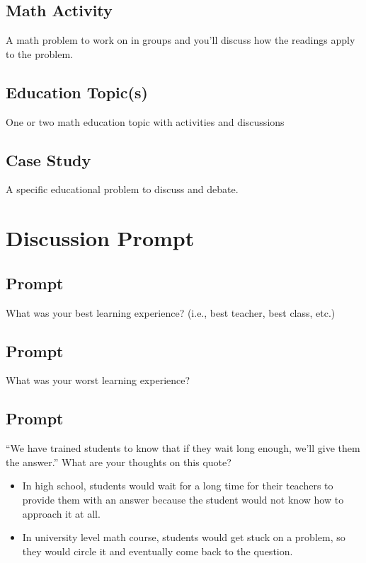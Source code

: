 \documentclass[11pt]{amsart}
\begin{document}
\subsection{Math Activity}

A math problem to work on in groups and you'll discuss how the readings apply to the problem.

\subsection{Education Topic(s)}

One or two math education topic with activities and discussions

\subsection{Case Study}

A specific educational problem to discuss and debate.

\section{Discussion Prompt}

\subsection{Prompt} 

What was your best learning experience? (i.e., best teacher, best class, etc.)

\subsection{Prompt}

What was your worst learning experience?

\subsection{Prompt}

``We have trained students to know that if they wait long enough, we'll give them the answer.'' What are your thoughts on this quote?

\begin{itemize}
    \item In high school, students would wait for a long time for their teachers to provide them with an answer because the student would not know how to approach it at all.
    \item In university level math course, students would get stuck on a problem, so they would circle it and eventually come back to the question.
\end{itemize}
\end{document}
